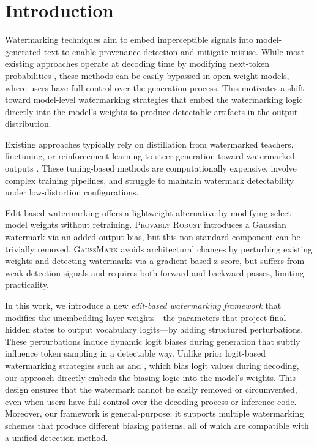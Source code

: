 \section{Introduction}

Watermarking techniques aim to embed imperceptible signals into model-generated text to enable provenance detection and mitigate misuse. While most existing approaches operate at decoding time by modifying next-token probabilities \citep{kirchenbauer2023watermark, aaronson2023reform, kuditipudi2023robust, liu2024adaptive}, these methods can be easily bypassed in open-weight models, where users have full control over the generation process. This motivates a shift toward model-level watermarking strategies that embed the watermarking logic directly into the model's weights to produce detectable artifacts in the output distribution.

Existing approaches typically rely on distillation from watermarked teachers, finetuning, or reinforcement learning to steer generation toward watermarked outputs \citep{gu2023learnability, xu2024learningwatermarkllmgeneratedtext, elhassan2025can}. These tuning-based methods are computationally expensive, involve complex training pipelines, and struggle to maintain watermark detectability under low-distortion configurations.

Edit-based watermarking offers a lightweight alternative by modifying select model weights without retraining. \textsc{Provably Robust} \cite{christ2024provably} introduces a Gaussian watermark via an added output bias, but this non-standard component can be trivially removed. \textsc{GaussMark} \cite{block2025gaussmark} avoids architectural changes by perturbing existing weights and detecting watermarks via a gradient-based z-score, but suffers from weak detection signals and requires both forward and backward passes, limiting practicality.

In this work, we introduce a new \emph{edit-based watermarking framework} that modifies the unembedding layer weights—the parameters that project final hidden states to output vocabulary logits—by adding structured perturbations. These perturbations induce dynamic logit biases during generation that subtly influence token sampling in a detectable way. Unlike prior logit-based watermarking strategies such as \citet{kirchenbauer2023watermark} and \citet{liu2024adaptive}, which bias logit values during decoding, our approach directly embeds the biasing logic into the model's weights. This design ensures that the watermark cannot be easily removed or circumvented, even when users have full control over the decoding process or inference code. Moreover, our framework is general-purpose: it supports multiple watermarking schemes that produce different biasing patterns, all of which are compatible with a unified detection method.

